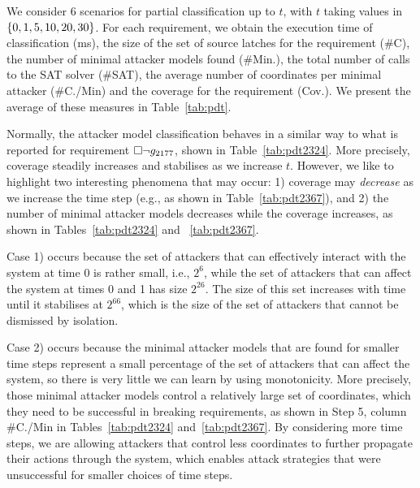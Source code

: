 {We consider 6 scenarios for partial classification up to $t$, with $t$ taking values in $\left\{0,1,5,10,20,30\right\}$. For each requirement, we obtain the execution time of classification (ms), the size of the set of source latches for the requirement (\#C), the number of minimal attacker models found (\#Min.), the total number of calls to the SAT solver (\#SAT), the average number of coordinates per minimal attacker (\#C./Min) and the coverage for the requirement (Cov.). We present the average of these measures in Table~\ref{tab:pdt}. 

Normally, the attacker model classification behaves in a similar way to what is reported for requirement $ {{\square}} \lnot g_{2177}$, shown in Table~\ref{tab:pdt2324}. More precisely, coverage steadily increases and stabilises as we increase $t$. However, we like to highlight two interesting phenomena that may occur: 1) coverage {may} \emph{decrease} as we increase the time step (e.g., as shown in Table~\ref{tab:pdt2367}), and 2) the number of minimal attacker models decreases while the coverage increases, as shown in Tables~\ref{tab:pdt2324} and ~\ref{tab:pdt2367}. 


Case 1) occurs because the set of attackers that can effectively interact with the system at time 0 is rather small, i.e., $2^6$, while the set of attackers that can affect the system at times 0 and 1 has size $2^{26}$. The size of this set increases with time until it stabilises at $2^{66}$, which is the size of the set of attackers that cannot be dismissed by isolation. 

Case 2) occurs because the minimal attacker models that are found for smaller time steps represent a small percentage of the set of attackers that can affect the system, so there is very little we can learn by using monotonicity. More precisely, those minimal attacker models control a relatively large set of coordinates, which they need to be successful in breaking requirements, as shown in Step 5, column \#C./Min in Tables~\ref{tab:pdt2324} and~\ref{tab:pdt2367}. By considering more time steps, we are allowing attackers that control less coordinates to further propagate their actions through the system, which enables attack strategies that were unsuccessful for smaller choices of time steps.

}
